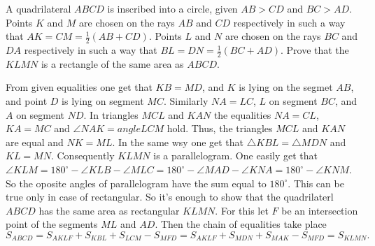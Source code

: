 \problem
A quadrilateral $ABCD$ is inscribed into a circle, given $AB > CD$ and $BC > AD$.
Points $K$ and $M$ are chosen on the rays $AB$ and $CD$ respectively in such a
way that $AK = CM = \frac{1}{2} (AB + CD)$.
Points $L$ and $N$ are chosen on the rays $BC$ and $DA$ respectively in such a
way that $BL = DN = \frac{1}{2} (BC + AD)$.
Prove that the $KLMN$ is a rectangle of the same area as $ABCD$.

\solution 
From given equalities one get that $KB=MD$, and $K$ is lying on the segmet $AB$,
and point $D$ is lying on segment $MC$. Similarly $NA=LC$, $L$ on segment $BC$, and $A$ on segment $ND$. In triangles $MCL$ and $KAN$ the equalities $NA=CL$, $KA=MC$ and $\angle NAK=angle LCM$ hold. Thus, the triangles $MCL$ and $KAN$ are equal and $NK=ML$.
In the same wsy one get that $\triangle KBL=\triangle MDN$ and $KL=MN$. Consequently $KLMN$ is a parallelogram. One easily get that $\angle KLM=180^\circ-\angle KLB-\angle MLC=180^\circ-\angle MAD-\angle KNA=180^\circ-\angle KNM$. So the oposite angles of parallelogram have the sum equal to $180^\circ$. This can be true only in case of rectangular. So it's enough to show that the quadrilaterl $ABCD$ has the same area as rectangular $KLMN$. For this let $F$  be an intersection point of the segments $ML$ and $AD$. Then the chain of equalities take place 
\[
S_{ABCD}=S_{AKLF}+S_{KBL}+S_{LCM}-S_{MFD}=S_{AKLF}+S_{MDN}+S_{MAK}-S_{MFD}=S_{KLMN}.
\]
\endproblem
